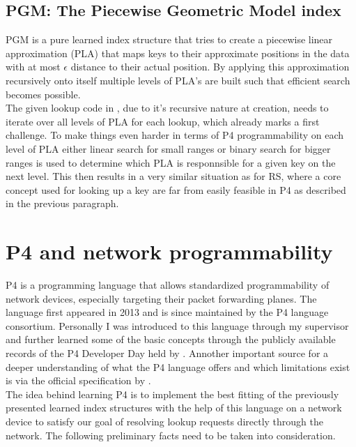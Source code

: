 \subsection{PGM: The Piecewise Geometric Model index}
PGM \cite{pgm} is a pure learned index structure that tries to create a piecewise linear approximation (PLA) that maps keys to their approximate positions in the data with at most $\epsilon$ distance to their actual position. By applying this approximation recursively onto itself multiple levels of PLA's are built such that efficient search becomes possible.\\
The given lookup code in \cite{pgm}, due to it's recursive nature at creation, needs to iterate over all levels of PLA for each lookup, which already marks a first challenge. To make things even harder in terms of P4 programmability on each level of PLA either linear search for small ranges or binary search for bigger ranges is used to determine which PLA is responnsible for a given key on the next level. This then results in a very similar situation as for RS, where a core concept used for looking up a key are far from easily feasible in P4 as described in the previous paragraph.

\section{P4 and network programmability}
P4 is a programming language that allows standardized programmability of network devices, especially targeting their packet forwarding planes. The language first appeared in 2013 and is since maintained by the P4 language consortium. Personally I was introduced to this language through my supervisor and further learned some of the basic concepts through the publicly available records of the P4 Developer Day held by \cite{p4-devday}. Annother important source for a deeper understanding of what the P4 language offers and which limitations exist is via the official specification by \cite{p4-spec}.\\
The idea behind learning P4 is to implement the best fitting of the previously presented learned index structures with the help of this language on a network device to satisfy our goal of resolving lookup requests directly through the network. The following preliminary facts need to be taken into consideration.


